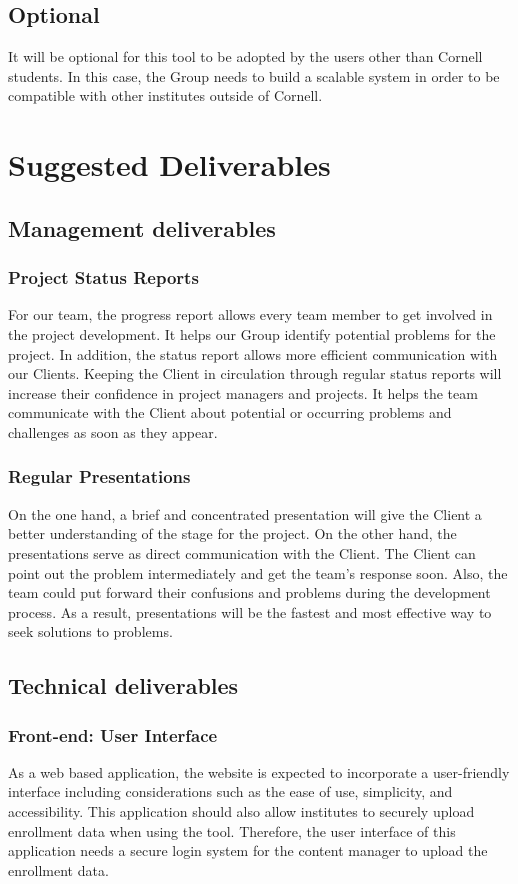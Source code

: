 \documentclass{article}
\begin{document}
\subsection{Optional}
It will be optional for this tool to be adopted by the users other than Cornell students. In this case, the Group needs to build a scalable system in order to be compatible with other institutes outside of Cornell.

\section{Suggested Deliverables}
\subsection{Management deliverables}
\subsubsection{Project Status Reports}
For our team, the progress report allows every team member to get involved in the project development. It helps our Group identify potential problems for the project. In addition, the status report allows more efficient communication with our Clients. Keeping the Client in circulation through regular status reports will increase their confidence in project managers and projects. It helps the team communicate with the Client about potential or occurring problems and challenges as soon as they appear.
\subsubsection{Regular Presentations}
On the one hand, a brief and concentrated presentation will give the Client a better understanding of the stage for the project. On the other hand, the presentations serve as direct communication with the Client. The Client can point out the problem intermediately and get the team’s response soon. Also, the team could put forward their confusions and problems during the development process. As a result, presentations will be the fastest and most effective way to seek solutions to problems.
\subsection{Technical deliverables}
\subsubsection{Front-end: User Interface}
As a web based application, the website is expected to incorporate a user-friendly interface including considerations such as the ease of use, simplicity, and accessibility. This application should also allow institutes to securely upload enrollment data when using the tool. Therefore, the user interface of this application needs a secure login system for the content manager to upload the enrollment data.
\end{document}
